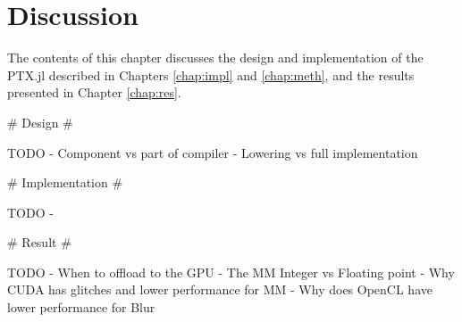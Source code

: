 \chapter{Discussion}
\begin{markdown}

The contents of this chapter discusses the design and implementation
of the PTX.jl described in Chapters \ref{chap:impl} and
\ref{chap:meth}, and the results presented in Chapter \ref{chap:res}.

# Design #

TODO
- Component vs part of compiler
- Lowering vs full implementation

# Implementation #

TODO
- 

# Result #


TODO
- When to offload to the GPU
- The MM Integer vs Floating point
- Why CUDA has glitches and lower performance for MM
- Why does OpenCL have lower performance for Blur

\end{markdown}
